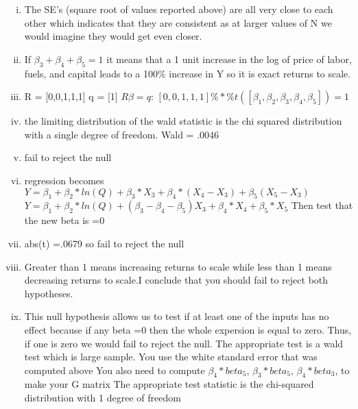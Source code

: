 \documentclass{article}
\begin{document}
\begin{enumerate}
\begin{enumerate}[i)]
				       
				\item The SE's (square root of values reported above) are all very close to each other which indicates that they are consistent as at larger values of N we would imagine they would get even closer.
				\item If $\beta_{3} + \beta_{4} + \beta_{5}=1$ it means that a 1 unit increase in the log of price of labor, fuels, and capital leads to a 100\% increase in Y so it is exact returns to scale.
				\item 
				R = [0,0,1,1,1]\newline
				q = [1] \newline
				$R\beta=q$: \newline
				$[0,0,1,1,1]\%*\%t([\beta_{1},\beta_{2},\beta_{3}, \beta_{4},\beta_{5}])=1$ \newline
				\item the limiting distribution of the wald statistic is the chi squared distribution with a single degree of freedom. Wald = .0046
				\item fail to reject the null
				\item regression becomes $Y=\beta_{1}+\beta_{2}*ln(Q)+\beta_3*X_3+\beta_4*(X_4-X_3)+\beta_5(X_5-X_3)$
				\newline 
				$Y=\beta_{1}+\beta_{2}*ln(Q)+(\beta_3-\beta_4-\beta_5)X_3+\beta_4*X_4+\beta_5*X_5$ \newline
				Then test that the new beta is =0
				\item abs(t) =.0679 so fail to reject the null
				\item  Greater than 1 means increasing returns to scale while less than 1 means decreasing returns to scale.I conclude that you should fail to reject both hypotheses.
				\item  This null hypothesis allows us to test if at least one of the inputs has no effect because if any beta =0 then the whole expersion is equal to zero. Thus, if one is zero we would fail to reject the null. The appropriate test is a wald test which is large sample. \newline
				\newline
				You use the white standard error that was computed above \newline
				You also need to compute $\beta_4*beta_5$, $\beta_3*beta_5$, $\beta_4*beta_3$, to make your G matrix \newline \newline
				The appropriate test statistic is the chi-squared distribution with 1 degree of freedom

\end{enumerate}
\end{enumerate}
\end{document}
